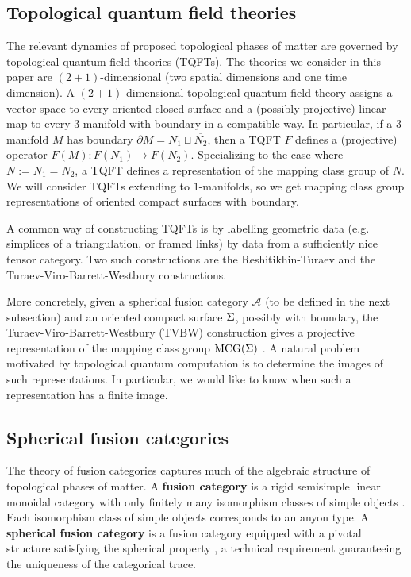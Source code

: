 \subsection{Topological quantum field theories}
The relevant dynamics of proposed topological phases of matter are governed by topological quantum field theories (TQFTs). The theories we consider in this paper are $(2+1)$-dimensional (two spatial dimensions and one time dimension). A $(2+1)$-dimensional topological quantum field theory assigns a vector space to every oriented closed surface and a (possibly projective) linear map to every $3$-manifold with boundary in a compatible way.  In particular, if a $3$-manifold $M$ has boundary $\partial M = N_1 \sqcup \overline{N_2}$, then a TQFT $F$  defines a (projective) operator $F(M) : F(N_1) \to F(N_2)$.   Specializing to the case where $N := N_1 = N_2$, a TQFT defines a representation of the mapping class group of $N$.  We will consider TQFTs extending to $1$-manifolds, so we get mapping class group representations of oriented compact surfaces with boundary.

A common way of constructing TQFTs is by labelling geometric data (e.g. simplices of a triangulation, or framed links) by data from a sufficiently nice tensor category.  Two such constructions are the Reshitikhin-Turaev \cite{reshetikhin1991invariants} and the Turaev-Viro-Barrett-Westbury \cite{hep-th/9311155, TURAEV1992865} constructions.

More concretely, given a spherical fusion category $\mathcal A$ (to be defined in the next subsection) and an oriented compact surface $\Sigma$, possibly with boundary, the Turaev-Viro-Barrett-Westbury (TVBW) construction gives a projective representation of the mapping class group $\operatorname{MCG}(\Sigma)$ \cite{hep-th/9311155, TURAEV1992865}. A natural problem motivated by topological quantum computation is to determine the images of such representations.  In particular, we would like to know when such a representation has a finite image.

\subsection{Spherical fusion categories}
The theory of fusion categories captures much of the algebraic structure of topological phases of matter. A \textbf{fusion category} is a rigid semisimple linear monoidal category with only finitely many isomorphism classes of simple objects \cite{etingofTensor}.  Each isomorphism class of simple objects corresponds to an anyon type.  A \textbf{spherical fusion category} is a fusion category equipped with a pivotal structure satisfying the spherical property \cite{etingofTensor}, a technical requirement guaranteeing the uniqueness of the categorical trace.  

